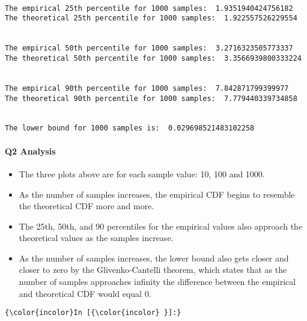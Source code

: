\documentclass[11pt]{article}
\providecommand{\tightlist}{%
      \setlength{\itemsep}{0pt}\setlength{\parskip}{0pt}}
\begin{document}
    \begin{center}
    \end{center}
    { \hspace*{\fill} \\}
    
    \begin{Verbatim}[commandchars=\\\{\}]
The empirical 25th percentile for 1000 samples:  1.9351940424756182
The theoretical 25th percentile for 1000 samples:  1.922557526229554


The empirical 50th percentile for 1000 samples:  3.2716323505773337
The theoretical 50th percentile for 1000 samples:  3.3566939800333224


The empirical 90th percentile for 1000 samples:  7.842871799399977
The theoretical 90th percentile for 1000 samples:  7.779440339734858


The lower bound for 1000 samples is:  0.029698521483102258

    \end{Verbatim}

    \hypertarget{q2-analysis}{%
\paragraph{Q2 Analysis}\label{q2-analysis}}

    \begin{itemize}
\tightlist
\item
  The three plots above are for each sample value: 10, 100 and 1000.
\item
  As the number of samples increases, the empirical CDF begins to
  resemble the theoretical CDF more and more.
\item
  The 25th, 50th, and 90 percentiles for the empirical values also
  approach the theoretical values as the samples increase.
\item
  As the number of samples increases, the lower bound also gets closer
  and closer to zero by the Glivenko-Cantelli theorem, which states that
  as the number of samples approaches infinity the difference between
  the empirical and theoretical CDF would equal 0.
\end{itemize}

    \begin{Verbatim}[commandchars=\\\{\}]
{\color{incolor}In [{\color{incolor} }]:} 
\end{Verbatim}


    
    
    
    
\end{document}
